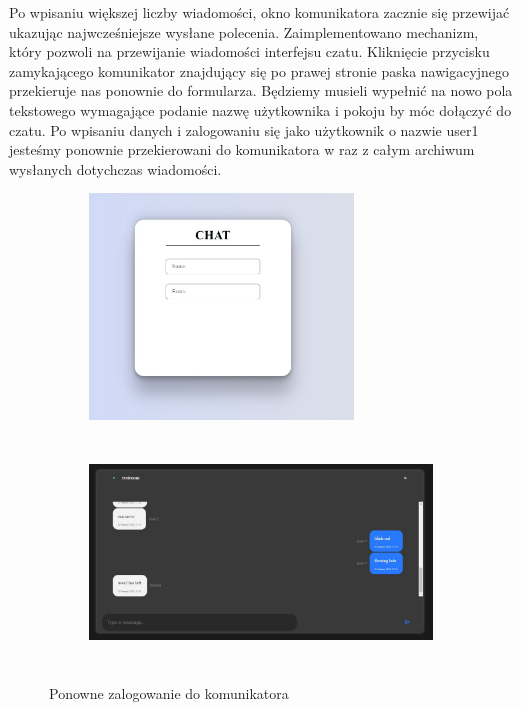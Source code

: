 Po wpisaniu większej liczby wiadomości, okno komunikatora zacznie się przewijać ukazując najwcześniejsze wysłane polecenia. Zaimplementowano mechanizm, który pozwoli na przewijanie wiadomości interfejsu czatu.
\newpage
Kliknięcie przycisku zamykającego komunikator znajdujący się po prawej stronie paska nawigacyjnego przekieruje nas ponownie do formularza.  Będziemy musieli wypełnić na nowo pola tekstowego wymagające podanie nazwę użytkownika i pokoju by móc dołączyć do czatu. Po wpisaniu danych i zalogowaniu się jako użytkownik o nazwie user1 jesteśmy ponownie przekierowani do komunikatora w raz z całym archiwum wysłanych dotychczas wiadomości.
\begin{figure}[h]
\begin{subfigure}{0.5\textwidth}
\includegraphics[width=0.9\linewidth, height=6cm]{"obrazy/TESTLOGOWANIE"} 


\end{subfigure}
\begin{subfigure}{0.5\textwidth}
\includegraphics[width=0.9\linewidth, height=6cm]{"obrazy/TESTostatniscreen"}


\end{subfigure}

\caption{Ponowne zalogowanie do komunikatora}
\label{fig49}
\end{figure}



